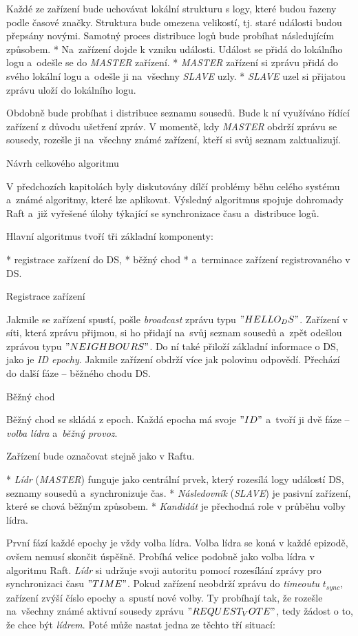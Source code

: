 Každé ze zařízení bude uchovávat lokální {\sbf strukturu s logy}, které budou řazeny podle časové značky. Struktura bude omezena velikostí, tj. staré události budou přepsány novými. Samotný proces distribuce logů bude probíhat následujícím způsobem.
\begitems
* Na~zařízení dojde k vzniku události. Událost se přidá do lokálního logu a~odešle se do {\em MASTER} zařízení.
* {\em MASTER} zařízení si zprávu přidá do svého lokální logu a~odešle ji na~všechny {\em SLAVE} uzly.
* {\em SLAVE} uzel si přijatou zprávu uloží do lokálního logu.
\enditems

Obdobně bude probíhat i distribuce seznamu sousedů. Bude k ní využíváno řídící zařízení z důvodu ušetření zpráv. V momentě, kdy {\em MASTER} obdrží zprávu se sousedy, rozešle ji na~všechny známé zařízení, kteří si svůj seznam zaktualizují.

\sec Návrh celkového algoritmu

V předchozích kapitolách byly diskutovány dílčí problémy běhu celého systému a~známé algoritmy, které lze aplikovat. Výsledný algoritmus spojuje dohromady Raft a~již vyřešené úlohy týkající se synchronizace času a~distribuce logů.

Hlavní algoritmus tvoří tři {\sbf základní komponenty}:

\begitems
* registrace zařízení do DS,
* běžný chod
* a~terminace zařízení registrovaného v DS. 
\enditems

\secc Registrace zařízení

Jakmile se zařízení spustí, pošle {\em broadcast} zprávu typu $"HELLO_DS"$. Zařízení v síti, která zprávu přijmou, si ho přidají na~svůj seznam sousedů a~zpět odešlou zprávou typu $"NEIGHBOURS"$. Do ní také přiloží základní informace o DS, jako je {\em ID epochy}. Jakmile zařízení obdrží více jak polovinu odpovědí. Přechází do další fáze – běžného chodu DS.

\secc Běžný chod

Běžný chod se skládá z {\sbf epoch}. Každá epocha má svoje $"ID"$ a~tvoří ji dvě fáze – {\em volba lídra} a~{\em běžný provoz}.

Zařízení bude označovat stejně jako v Raftu.

\begitems
* {\em Lídr} ({\em MASTER}) funguje jako centrální prvek, který rozesílá logy událostí DS, seznamy sousedů a~synchronizuje čas.
* {\em Následovník} ({\em SLAVE}) je pasivní zařízení, které se chová běžným způsobem.
* {\em Kandidát} je přechodná role v průběhu volby lídra.
\enditems

První fází každé epochy je vždy {\sbf volba lídra}. Volba lídra se koná v každé epizodě, ovšem nemusí skončit úspěšně. Probíhá velice podobně jako volba lídra v algoritmu Raft. {\em Lídr} si udržuje svoji autoritu pomocí rozesílání zprávy pro synchronizaci času $"TIME"$. Pokud zařízení neobdrží zprávu do {\em timeoutu} $t_{sync}$, zařízení zvýší číslo epochy a~spustí nové volby. Ty probíhají tak, že rozešle na~všechny známé aktivní sousedy zprávu $"REQUEST_VOTE"$, tedy žádost o to, že chce být {\em lídrem}. Poté může nastat jedna ze těchto tří situací:

